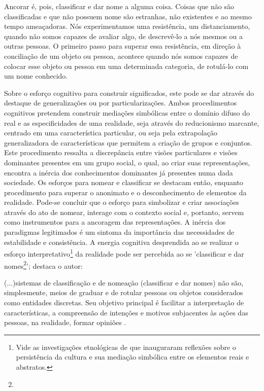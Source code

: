 \documentclass[
  12pt,       %
  openright,      %
  twoside,      %
  a4paper,      %
  english,      %
  french,       %
  spanish,      %
  brazil        %
  ]{abntex2}
\begin{document}
\begin{citacao}
Ancorar é, pois, classificar e dar nome a alguma coisa. Coisas
que não são classificadas e que não possuem nome são estranhas,
não existentes e ao mesmo tempo ameaçadoras. Nós experimentamos 
uma resistência, um distanciamento, quando não somos 
capazes de avaliar algo, de descrevê-lo a nós mesmos ou a outras
pessoas. O primeiro passo para superar essa resistência, em 
direção à conciliação de um objeto ou pessoa, acontece quando nós
somos capazes de colocar esse objeto ou pessoa em uma 
determinada categoria, de rotulá-lo com um nome conhecido.\cite[p.61-62]{Representacees_sociais_moscovici}
\end{citacao}


Sobre o esforço cognitivo para construir significados, este pode se dar através do destaque de generalizações ou por particularizações. Ambos procedimentos cognitivos pretendem construir mediações simbólicas entre o domínio difuso do real e as especificidades de uma realidade, seja através do reducionismo marcante, centrado em uma característica particular, ou seja pela extrapolação generalizadora de características que permitem a criação de grupos e conjuntos. Este procedimento ressalta a discrepância entre visões particulares e visões dominantes presentes em um grupo social, o qual, ao criar suas representações, encontra a inércia dos conhecimentos dominantes já presentes numa dada sociedade. Os esforços para nomear e classificar se destacam então, enquanto procedimento para superar o anonimato e o desconhecimento de elementos da realidade. Pode-se concluir que o esforço para simbolizar e criar associações através do ato de nomear, interage com o contexto social e, portanto, servem como instrumentos para a ancoragem das representações. A inércia dos paradigmas legitimados é um sintoma da importância das necessidades de estabilidade e consistência. A energia cognitiva desprendida ao se realizar o esforço interpretativo\footnote{Vide as investigações etnológicas de  que inauguraram reflexões sobre o persistência da cultura e sua mediação simbólica entre os elementos reais e abstratos.} da realidade pode ser percebida ao se 'classificar e dar nomes\footnote{}'; destaca o autor:

\begin{citacao}
(...)sistemas de classificação e de nomeação
(classificar e dar nomes) não são, simplesmente, meios de graduar
e de rotular pessoas ou objetos considerados como entidades 
discretas. Seu objetivo principal é facilitar a interpretação de 
características, a compreensão de intenções e motivos subjacentes às
ações das pessoas, na realidade, formar opiniões \cite[p.70]{Representacees_sociais_moscovici}.
\end{citacao}
\end{document}
